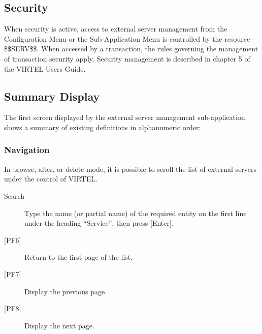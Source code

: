 \documentclass[letterpaper,10pt,english]{sphinxmanual}
\begin{document}

\subsection{Security}
\label{\detokenize{connectivity_guide:id67}}\label{\detokenize{connectivity_guide:index-131}}
When security is active, access to external server management from the Configuration Menu or the Sub-Application Menu is controlled by the resource \$\$SERV\$\$.
When accessed by a transaction, the rules governing the management of transaction security apply.
Security management is described in chapter 5 of the VIRTEL Users Guide.


\subsection{Summary Display}
\label{\detokenize{connectivity_guide:index-132}}\label{\detokenize{connectivity_guide:id68}}
The first screen displayed by the external server management sub-application shows a summary of existing definitions in alphanumeric order:



\subsubsection{Navigation}
\label{\detokenize{connectivity_guide:id69}}
In browse, alter, or delete mode, it is possible to scroll the list of external servers under the control of VIRTEL.
\begin{description}
\item[{Search}] \leavevmode
Type the name (or partial name) of the required entity on the first line under the heading “Service”, then press {[}Enter{]}.

\item[{{[}PF6{]}}] \leavevmode
Return to the first page of the list.

\item[{{[}PF7{]}}] \leavevmode
Display the previous page.

\item[{{[}PF8{]}}] \leavevmode
Display the next page.

\end{description}
\end{document}
